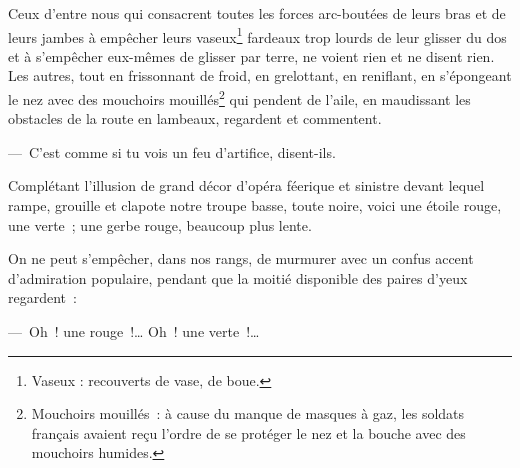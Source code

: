 {Ceux d'entre nous qui consacrent toutes les forces arc-boutées de
leurs bras et de leurs jambes à empêcher leurs vaseux\footnote{Vaseux
: recouverts de vase, de boue.} fardeaux trop lourds de leur glisser
du dos et à s'empêcher eux-mêmes de glisser par terre, ne voient rien
et ne disent rien. Les autres, tout en frissonnant de froid, en
grelottant, en reniflant, en s'épongeant le nez avec des mouchoirs
mouillés\footnote{Mouchoirs mouillés~: à cause du manque de masques à
gaz, les soldats français avaient reçu l'ordre de se protéger le nez
et la bouche avec des mouchoirs humides.} qui pendent de l'aile, en
maudissant les obstacles de la route en lambeaux, regardent et
commentent.

—~C'est comme si tu vois un feu d'artifice, disent-ils.

Complétant l'illusion de grand décor d'opéra féerique et sinistre
devant lequel rampe, grouille et clapote notre troupe basse, toute
noire, voici une étoile rouge, une verte~; une gerbe rouge, beaucoup
plus lente.

On ne peut s'empêcher, dans nos rangs, de murmurer avec un confus
accent d'admiration populaire, pendant que la moitié disponible des
paires d'yeux regardent~:

—~Oh~! une rouge~!… Oh~! une verte~!…
}

